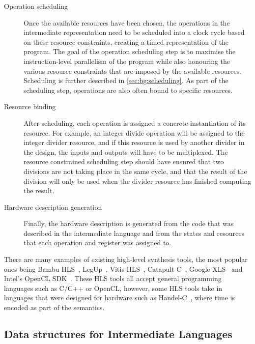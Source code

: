 \begin{description}
\item[Operation scheduling] Once the available resources have been chosen, the
  operations in the intermediate representation need to be scheduled into a
  clock cycle based on these resource constraints, creating a timed
  representation of the program.  The goal of the operation scheduling step is
  to maximise the instruction-level parallelism of the program while also
  honouring the various resource constraints that are imposed by the available
  resources.  Scheduling is further described in \cref{sec:bg:scheduling}.  As
  part of the scheduling step, operations are also often bound to specific
  resources.

\item[Resource binding] After scheduling, each operation is assigned a concrete
  instantiation of its resource.  For example, an integer divide operation will
  be assigned to the integer divider resource, and if this resource is used by
  another divider in the design, the inputs and outputs will have to be
  multiplexed.  The resource constrained scheduling step should have ensured
  that two divisions are not taking place in the same cycle, and that the result
  of the division will only be used when the divider resource has finished
  computing the result.

\item[Hardware description generation] Finally, the hardware description is
  generated from the code that was described in the intermediate language and
  from the states and resources that each operation and register was assigned
  to.
\end{description}

There are many examples of existing high-level synthesis tools, the most popular
ones being Bambu HLS~\cite{pilato13_bambu}, LegUp~\cite{canis13_l}, Vitis
HLS~\cite{amd23_vitis_high_synth}, Catapult
C~\cite{mentor20_catap_high_level_synth}, Google XLS~\cite{google23_xls} and
Intel's OpenCL SDK~\cite{intel20_sdk_openc_applic}.  These HLS tools all accept
general programming languages such as C/C++ or OpenCL, however, some HLS tools
take in languages that were designed for hardware such as
Handel-C~\cite{aubury96_handel_c_languag_refer_guide}, where time is encoded as
part of the semantics.

\subsection{Data structures for Intermediate Languages}%
\label{sec:bg:data-structures-for-intermediate-languages}

